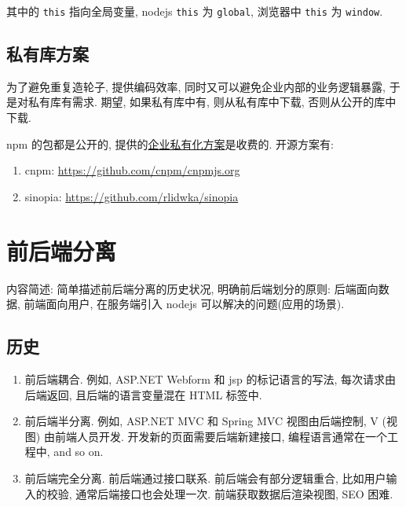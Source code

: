 其中的 \lstinline!this! 指向全局变量, nodejs \lstinline!this! 为
\lstinline!global!, 浏览器中 \lstinline!this! 为 \lstinline!window!.

\subsection{私有库方案}\label{ux79c1ux6709ux5e93ux65b9ux6848}

为了避免重复造轮子, 提供编码效率, 同时又可以避免企业内部的业务逻辑暴露,
于是对私有库有需求. 期望, 如果私有库中有, 则从私有库中下载,
否则从公开的库中下载.

npm 的包都是公开的,
提供的\href{https://www.npmjs.com/enterprise}{企业私有化方案}是收费的.
开源方案有:

\begin{enumerate}
\def\labelenumi{\arabic{enumi}.}
\tightlist
\item
  cnpm: \url{https://github.com/cnpm/cnpmjs.org}
\item
  sinopia: \url{https://github.com/rlidwka/sinopia}
\end{enumerate}

\section{前后端分离}\label{ux524dux540eux7aefux5206ux79bb}

内容简述: 简单描述前后端分离的历史状况, 明确前后端划分的原则:
后端面向数据, 前端面向用户, 在服务端引入 nodejs
可以解决的问题(应用的场景).

\subsection{历史}\label{ux5386ux53f2}

\begin{enumerate}
\def\labelenumi{\arabic{enumi}.}
\tightlist
\item
  前后端耦合. 例如, ASP.NET Webform 和 jsp 的标记语言的写法,
  每次请求由后端返回, 且后端的语言变量混在 HTML 标签中.
\item
  前后端半分离. 例如, ASP.NET MVC 和 Spring MVC 视图由后端控制, V (视图)
  由前端人员开发. 开发新的页面需要后端新建接口,
  编程语言通常在一个工程中, and so on.
\item
  前后端完全分离. 前后端通过接口联系. 前后端会有部分逻辑重合,
  比如用户输入的校验, 通常后端接口也会处理一次. 前端获取数据后渲染视图,
  SEO 困难.
\end{enumerate}

